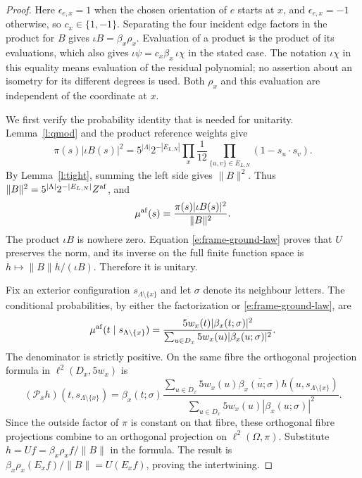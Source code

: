 \begin{proof}
Here \(\epsilon_{e,x}=1\) when the chosen orientation of \(e\)
starts at \(x\), and \(\epsilon_{e,x}=-1\) otherwise, so
\(c_x\in\{1,-1\}\). Separating the four incident edge factors
in the product for \(B\) gives \(\iota B=\beta_x\rho_x\).
Evaluation of a product is the product of its evaluations, which
also gives \(\iota\psi=c_x\beta_x\,\iota\chi\) in the stated
case. The notation \(\iota\chi\) in this equality means evaluation
of the residual polynomial; no assertion about an isometry for its
different degrees is used. Both \(\rho_x\) and this evaluation
are independent of the coordinate at \(x\).

We first verify the probability identity that is needed for
unitarity. Lemma~\ref{l:qmod} and the product reference weights give
\begin{equation}\label{e:frame-ground-weight}
 \pi(s)|\iota B(s)|^2
 =5^{|\Lambda|}2^{-|E_{L,N}|}
       \prod_x\frac1{12}
       \prod_{\{u,v\}\in E_{L,N}}(1-s_u\cdot s_v).
\end{equation}
By Lemma~\ref{l:tight}, summing the left side gives \(\|B\|^2\).
Thus
\(\|B\|^2=5^{|\Lambda|}2^{-|E_{L,N}|}Z^{\rm af}\), and
\begin{equation}\label{e:frame-ground-law}
 \mu^{\rm af}(s)=\frac{\pi(s)|\iota B(s)|^2}{\|B\|^2}.
\end{equation}
The product \(\iota B\) is nowhere zero. Equation
\eqref{e:frame-ground-law} proves that \(U\) preserves the norm,
and its inverse on the full finite function space is
\(h\mapsto\|B\|h/(\iota B)\). Therefore it is unitary.

Fix an exterior configuration \(s_{\Lambda\setminus\{x\}}\)
and let \(\sigma\) denote its neighbour letters. The conditional
probabilities, by either the factorization or
\eqref{e:frame-ground-law}, are
\[
 \mu^{\rm af}(t\mid s_{\Lambda\setminus\{x\}})
 =\frac{5w_x(t)|\beta_x(t;\sigma)|^2}
        {\sum_{u\in D_x}5w_x(u)|\beta_x(u;\sigma)|^2}.
\]
The denominator is strictly positive. On the same fibre the
orthogonal projection formula in \(\ell^2(D_x,5w_x)\) is
\[
 (\mathcal P_xh)(t,s_{\Lambda\setminus\{x\}})
 =\beta_x(t;\sigma)
  \frac{\sum_{u\in D_x}5w_x(u)\overline{\beta_x(u;\sigma)}
                         h(u,s_{\Lambda\setminus\{x\}})}
       {\sum_{u\in D_x}5w_x(u)|\beta_x(u;\sigma)|^2}.
\]
Since the outside factor of \(\pi\) is constant on that fibre,
these orthogonal fibre projections combine to an orthogonal
projection on \(\ell^2(\Omega,\pi)\).
Substitute \(h=Uf=\beta_x\rho_x f/\|B\|\) in the formula.
The result is \(\beta_x\rho_x(E_xf)/\|B\|=U(E_xf)\), proving
the intertwining.


\end{proof}
